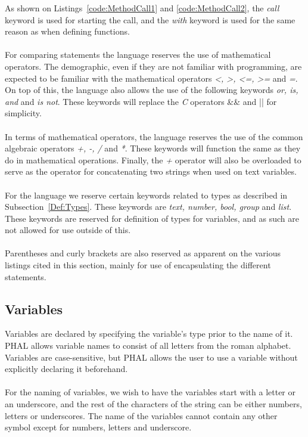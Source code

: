 As shown on Listings~\ref{code:MethodCall1} and \ref{code:MethodCall2}, the \textit{call} keyword is used for starting the call, and the \textit{with} keyword is used for the same reason as when defining functions. 
\\\\
For comparing statements the language reserves the use of mathematical operators. 
The demographic, even if they are not familiar with programming, are expected to be familiar with the mathematical operators \textit{<, >, <=, >=} and \textit{=}. 
On top of this, the language also allows the use of the following keywords \textit{or, is, and} and \textit{is not}. 
These keywords will replace the \textit{C} operators \&\& and || for simplicity.
\\\\
In terms of mathematical operators, the language reserves the use of the common algebraic operators \textit{+, -, /} and \textit{*}. 
These keywords will function the same as they do in mathematical operations. 
Finally, the \textit{+} operator will also be overloaded to serve as the operator for concatenating two strings when used on text variables.
\\\\
For the language we reserve certain keywords related to types as described in Subsection~\ref{Def:Types}. 
These keywords are \textit{text, number, bool, group} and \textit{list}. 
These keywords are reserved for definition of types for variables, and as such are not allowed for use outside of this.
\\\\
Parentheses and curly brackets are also reserved as apparent on the various listings cited in this section, mainly for use of encapsulating the different statements.

\subsection{Variables}
Variables are declared by specifying the variable's type prior to the name of it. 
PHAL allows variable names to consist of all letters from the roman alphabet.
\\
Variables are case-sensitive, but PHAL allows the user to use a variable without explicitly declaring it beforehand.
\\\\
For the naming of variables, we wish to have the variables start with a letter or an underscore, and the rest of the characters of the string can be either numbers, letters or underscores. 
The name of the variables cannot contain any other symbol except for numbers, letters and underscore.

